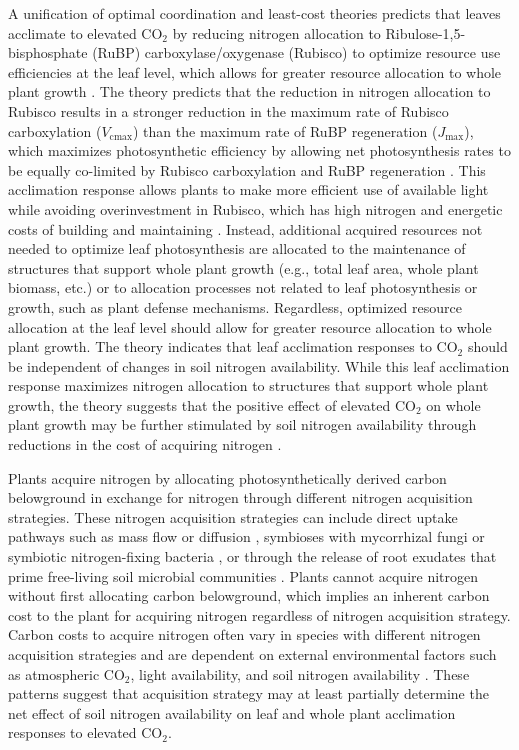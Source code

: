 A unification of optimal coordination and least-cost theories predicts that leaves acclimate to elevated CO$_2$ by reducing nitrogen allocation to Ribulose-1,5-bisphosphate (RuBP) carboxylase/oxygenase (Rubisco) to optimize resource use efficiencies at the leaf level, which allows for greater resource allocation to whole plant growth . The theory predicts that the reduction in nitrogen allocation to Rubisco results in a stronger reduction in the maximum rate of Rubisco carboxylation ($V_\mathrm{cmax}$) than the maximum rate of RuBP regeneration ($J_\mathrm{max}$), which maximizes photosynthetic efficiency by allowing net photosynthesis rates to be equally co-limited by Rubisco carboxylation and RuBP regeneration . This acclimation response allows plants to make more efficient use of available light while avoiding overinvestment in Rubisco, which has high nitrogen and energetic costs of building and maintaining . Instead, additional acquired resources not needed to optimize leaf photosynthesis are allocated to the maintenance of structures that support whole plant growth (e.g., total leaf area, whole plant biomass, etc.) or to allocation processes not related to leaf photosynthesis or growth, such as plant defense mechanisms. Regardless, optimized resource allocation at the leaf level should allow for greater resource allocation to whole plant growth. The theory indicates that leaf acclimation responses to CO$_2$ should be independent of changes in soil nitrogen availability. While this leaf acclimation response maximizes nitrogen allocation to structures that support whole plant growth, the theory suggests that the positive effect of elevated CO$_2$ on whole plant growth may be further stimulated by soil nitrogen availability through reductions in the cost of acquiring nitrogen .

Plants acquire nitrogen by allocating photosynthetically derived carbon belowground in exchange for nitrogen through different nitrogen acquisition strategies. These nitrogen acquisition strategies can include direct uptake pathways such as mass flow or diffusion , symbioses with mycorrhizal fungi or symbiotic nitrogen-fixing bacteria , or through the release of root exudates that prime free-living soil microbial communities . Plants cannot acquire nitrogen without first allocating carbon belowground, which implies an inherent carbon cost to the plant for acquiring nitrogen regardless of nitrogen acquisition strategy. Carbon costs to acquire nitrogen often vary in species with different nitrogen acquisition strategies and are dependent on external environmental factors such as atmospheric CO$_2$, light availability, and soil nitrogen availability . These patterns suggest that acquisition strategy may at least partially determine the net effect of soil nitrogen availability on leaf and whole plant acclimation responses to elevated CO$_2$.

